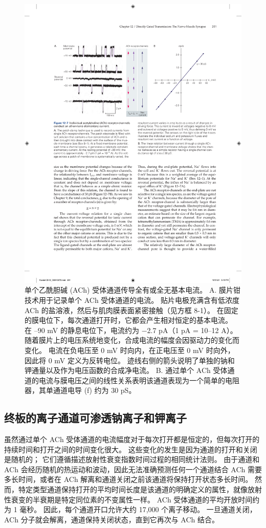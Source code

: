 \begin{figure}[htbp]
	\centering
	\includegraphics[width=0.9\linewidth]{chap12/fig_12_7}
	\caption{单个乙酰胆碱 (ACh) 受体通道传导全有或全无基本电流。 A. 膜片钳技术用于记录单个 ACh 受体通道的电流。 贴片电极充满含有低浓度 ACh 的盐溶液，然后与肌肉膜表面紧密接触（见方框 8-1）。 在固定的膜电位下，每次通道打开时，它都会产生相对恒定的基本电流。 在 –90 mV 的静息电位下，电流约为 −2.7 pA（1 pA = 10–12 A）。 随着膜片上的电压系统地变化，合成电流的幅度会因驱动力的变化而变化。 电流在负电压至 0 mV 时向内，在正电压至 0 mV 时向外，因此将 0 mV 定义为反转电位。 迹线右侧的箭头说明了单独的钠和钾通量以及作为电压函数的合成净电流。 B. 通过单个 ACh 受体通道的电流与膜电压之间的线性关系表明该通道表现为一个简单的电阻器，其单通道电导 (f) 约为 30 pS。}
	\label{fig:12_7}
\end{figure}



\subsection{终板的离子通道可渗透钠离子和钾离子}

虽然通过单个 ACh 受体通道的电流幅度对于每次打开都是恒定的，但每次打开的持续时间和打开之间的时间变化很大。
这些变化的发生是因为通道的打开和关闭是随机的；
它们遵循描述放射性衰变指数时间过程的相同统计法则。 
由于通道和 ACh 会经历随机的热运动和波动，因此无法准确预测任何一个通道结合 ACh 需要多长时间，或者在 ACh 解离和通道关闭之前该通道将保持打开状态多长时间。
然而，特定类型通道保持打开的平均时间长度是该通道的明确定义的属性，就像放射性衰变的半衰期是特定同位素的不变属性一样。
ACh 受体通道的平均开放时间约为 1 毫秒。
因此，每个通道开口允许大约 17,000 个离子移动。
一旦通道关闭，ACh 分子就会解离，通道保持关闭状态，直到它再次与 ACh 结合。


